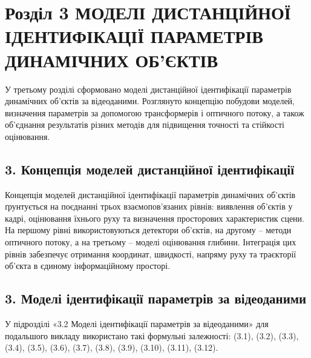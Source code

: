 \documentclass[
]{article}
\begin{document}
\section{Розділ 3 МОДЕЛІ ДИСТАНЦІЙНОЇ ІДЕНТИФІКАЦІЇ ПАРАМЕТРІВ ДИНАМІЧНИХ ОБ'ЄКТІВ}\label{ux440ux43eux437ux434ux456ux43b-3-ux43cux43eux434ux435ux43bux456-ux434ux438ux441ux442ux430ux43dux446ux456ux439ux43dux43eux457-ux456ux434ux435ux43dux442ux438ux444ux456ux43aux430ux446ux456ux457-ux43fux430ux440ux430ux43cux435ux442ux440ux456ux432-ux434ux438ux43dux430ux43cux456ux447ux43dux438ux445-ux43eux431ux454ux43aux442ux456ux432}

У третьому розділі сформовано моделі дистанційної ідентифікації параметрів динамічних об'єктів за відеоданими. Розглянуто концепцію побудови моделей, визначення параметрів за допомогою трансформерів і оптичного потоку, а також об'єднання результатів різних методів для підвищення точності та стійкості оцінювання.

\subsection{3. Концепція моделей дистанційної ідентифікації}\label{ux43aux43eux43dux446ux435ux43fux446ux456ux44f-ux43cux43eux434ux435ux43bux435ux439-ux434ux438ux441ux442ux430ux43dux446ux456ux439ux43dux43eux457-ux456ux434ux435ux43dux442ux438ux444ux456ux43aux430ux446ux456ux457}

Концепція моделей дистанційної ідентифікації параметрів динамічних об'єктів ґрунтується на поєднанні трьох взаємопов'язаних рівнів: виявлення об'єктів у кадрі, оцінювання їхнього руху та визначення просторових характеристик сцени. На першому рівні використовуються детектори об'єктів, на другому -- методи оптичного потоку, а на третьому -- моделі оцінювання глибини. Інтеграція цих рівнів забезпечує отримання координат, швидкості, напряму руху та траєкторії об'єкта в єдиному інформаційному просторі.

\subsection{3. Моделі ідентифікації параметрів за відеоданими}\label{ux43cux43eux434ux435ux43bux456-ux456ux434ux435ux43dux442ux438ux444ux456ux43aux430ux446ux456ux457-ux43fux430ux440ux430ux43cux435ux442ux440ux456ux432-ux437ux430-ux432ux456ux434ux435ux43eux434ux430ux43dux438ux43cux438}

У підрозділі «3.2 Моделі ідентифікації параметрів за відеоданими» для подальшого викладу використано такі формульні залежності: (3.1), (3.2), (3.3), (3.4), (3.5), (3.6), (3.7), (3.8), (3.9), (3.10), (3.11), (3.12).
\end{document}
